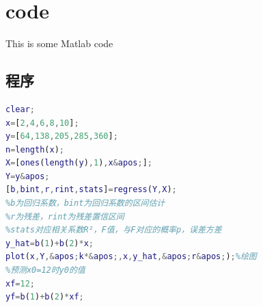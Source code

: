\documentclass[UTF8,12pt,a4paper]{article}
\begin{document}
\section{code}

This is some Matlab code
\subsection{程序}
\begin{lstlisting}[language={Matlab},morekeywords={regress}]
clear;
x=[2,4,6,8,10];
y=[64,138,205,285,360];
n=length(x);
X=[ones(length(y),1),x&apos;];
Y=y&apos;
[b,bint,r,rint,stats]=regress(Y,X);
%b为回归系数，bint为回归系数的区间估计
%r为残差，rint为残差置信区间
%stats对应相关系数R²，F值，与F对应的概率p，误差方差
y_hat=b(1)+b(2)*x;
plot(x,Y,&apos;k*&apos;,x,y_hat,&apos;r&apos;);%绘图
%预测x0=12时y0的值
xf=12;
yf=b(1)+b(2)*xf;
\end{lstlisting}


%
\end{document}
